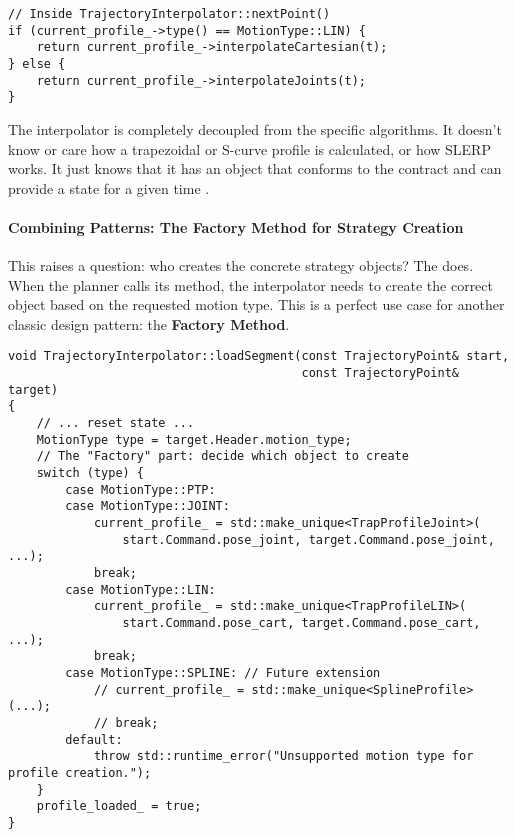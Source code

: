 \begin{verbatim}
// Inside TrajectoryInterpolator::nextPoint()
if (current_profile_->type() == MotionType::LIN) {
    return current_profile_->interpolateCartesian(t);
} else {
    return current_profile_->interpolateJoints(t);
}
\end{verbatim}
\label{lst:interpolation-logic}

The interpolator is completely decoupled from the specific algorithms. It doesn't know or care how a trapezoidal or S-curve profile is calculated, or how SLERP works. It just knows that it has an object that conforms to the  contract and can provide a state for a given time .

\paragraph{Combining Patterns: The Factory Method for Strategy Creation}
This raises a question: who creates the concrete strategy objects? The  does. When the planner calls its  method, the interpolator needs to create the correct  object based on the requested motion type. This is a perfect use case for another classic design pattern: the \textbf{Factory Method}.

\begin{verbatim}
void TrajectoryInterpolator::loadSegment(const TrajectoryPoint& start,
                                         const TrajectoryPoint& target) 
{
    // ... reset state ...
    MotionType type = target.Header.motion_type;
    // The "Factory" part: decide which object to create
    switch (type) {
        case MotionType::PTP:
        case MotionType::JOINT:
            current_profile_ = std::make_unique<TrapProfileJoint>(
                start.Command.pose_joint, target.Command.pose_joint, ...);
            break;
        case MotionType::LIN:
            current_profile_ = std::make_unique<TrapProfileLIN>(
                start.Command.pose_cart, target.Command.pose_cart, ...);
            break;
        case MotionType::SPLINE: // Future extension
            // current_profile_ = std::make_unique<SplineProfile>(...);
            // break;      
        default:
            throw std::runtime_error("Unsupported motion type for profile creation.");
    }
    profile_loaded_ = true;
}
\end{verbatim}
\label{lst:factory-method}

